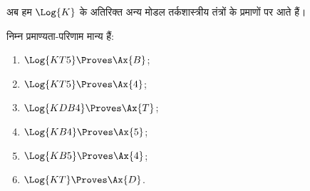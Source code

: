 \documentclass[../../../include/open-logic-section]{subfiles}
\begin{document}


अब हम $\Log{K}$ के अतिरिक्त अन्य मोडल तर्कशास्त्रीय तंत्रों के प्रमाणों पर
आते हैं।

\begin{prop}
निम्न प्रमाण्यता-परिणाम मान्य हैं:
  \begin{enumerate}
  \item $\Log{KT5} \Proves \Ax{B}$;
  \item $\Log{KT5} \Proves \Ax{4}$;
  \item $\Log{KDB4} \Proves \Ax{T}$;
  \item $\Log{KB4} \Proves \Ax{5}$;
  \item $\Log{KB5} \Proves \Ax{4}$;
  \item {}$\Log{KT} \Proves \Ax{D}$.
  \end{enumerate}
\end{prop}
\end{document}
